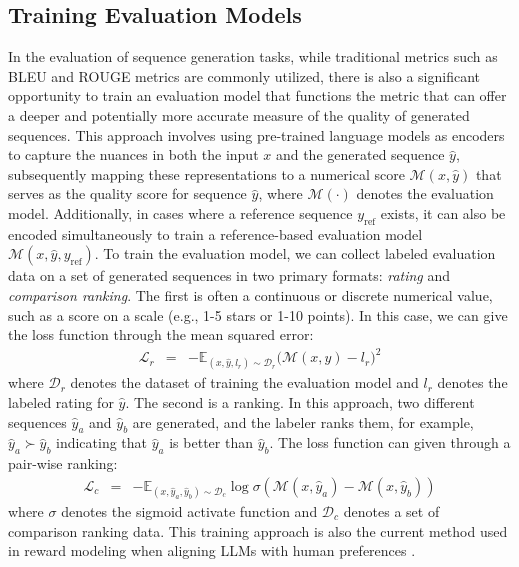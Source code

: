 \documentclass[lettersize,journal]{IEEEtran}
\begin{document}
\subsection{Training Evaluation Models}
\label{sec:background-training-evaltaion-models}
In the evaluation of sequence generation tasks, while traditional metrics such as BLEU and ROUGE metrics are commonly utilized, there is also a significant opportunity to train an evaluation model that functions the metric that can offer a deeper and potentially more accurate measure of the quality of generated sequences. This approach involves using pre-trained language models as encoders to capture the nuances in both the input $x$ and the generated sequence $\hat{y}$, subsequently mapping these representations to a numerical score $\mathcal{M}(x,\hat{y})$ that serves as the quality score for sequence $\hat{y}$, where $\mathcal{M}(\cdot)$ denotes the evaluation model. Additionally, in cases where a reference sequence $y_{\mathrm{ref}}$ exists, it can also be encoded simultaneously to train a reference-based evaluation model $\mathcal{M}(x,\hat{y}, y_{\mathrm{ref}})$. To train the evaluation model, we can collect labeled evaluation data on a set of generated sequences in two primary formats: \textit{rating} and \textit{comparison ranking}. The first is often a continuous or discrete numerical value, such as a score on a scale (e.g., 1-5 stars or 1-10 points). In this case, we can give the loss function through the mean squared error:
\begin{eqnarray}
     \mathcal{L}_{r} &=& - \mathbb{E}_{(x,\hat{y},l_r)\sim \mathcal{D}_{r}} \big(\mathcal{M}(x,\hat{y})- l_r\big)^2
\end{eqnarray}
where $\mathcal{D}_{r}$ denotes the dataset of training the evaluation model and $l_r$ denotes the labeled rating for $\hat{y}$. The second is a ranking. In this approach, two different sequences $\hat{y}_a$ and $\hat{y}_b$ are generated, and the labeler ranks them, for example, $\hat{y}_a \succ \hat{y}_b$ indicating that $\hat{y}_a$ is better than $\hat{y}_b$. The loss function can given through a pair-wise ranking:
\begin{eqnarray}
    \mathcal{L}_{c} &=& - \mathbb{E}_{(x,\hat{y}_{a},\hat{y}_{b})\sim \mathcal{D}_{c}} \log \sigma(\mathcal{M}(x,\hat{y}_{a}) - \mathcal{M}(x,\hat{y}_{b}))
    \label{eq:ranking-loss}
\end{eqnarray}
where $\sigma$ denotes the sigmoid activate function and $\mathcal{D}_{c}$ denotes a set of comparison ranking data. This training approach is also the current method used in reward modeling when aligning LLMs with human preferences \cite{ouyang2022training}.
\end{document}
